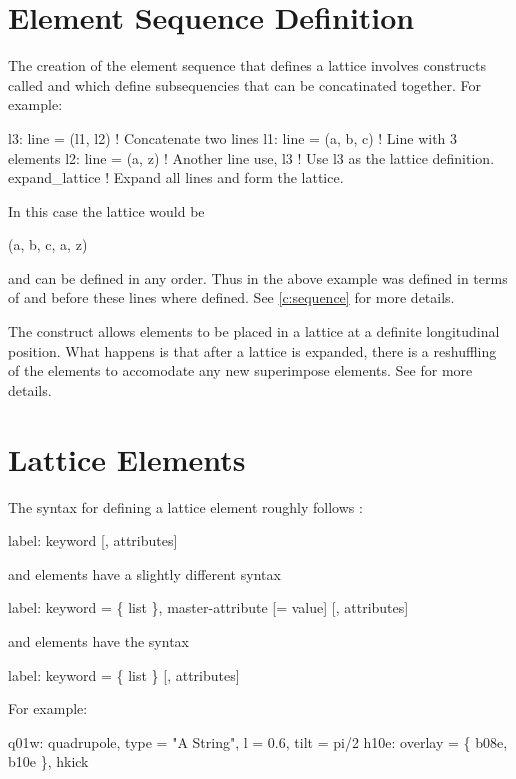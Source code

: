\section{Element Sequence Definition}

The creation of the element sequence that defines a lattice involves
constructs called  and  which define subsequencies
that can be concatinated together. For example:
\begin{example}
  l3: line = (l1, l2)   ! Concatenate two lines
  l1: line = (a, b, c)  ! Line with 3 elements
  l2: line = (a, z)     ! Another line 
  use, l3               ! Use l3 as the lattice definition.
  expand_lattice        ! Expand all lines and form the lattice.
\end{example}
In this case the lattice would be
\begin{example}
  (a, b, c, a, z)
\end{example}
 and  can be defined in any order. Thus in the
above example  was defined in terms of  and 
before these lines where defined. See \cref{c:sequence} for more details.

The  construct allows elements to be placed in a
lattice at a definite longitudinal position. What happens is that
after a lattice is expanded, there is a reshuffling of the elements to
accomodate any new superimpose elements. See  for more
details.

\section{Lattice Elements}

The syntax for defining a lattice element roughly follows \MAD:
\begin{example}
  label: keyword [, attributes]
\end{example}
 and  elements have a slightly different syntax
\begin{example}
  label: keyword = \{ list \}, master-attribute [= value] [, attributes]
\end{example}
and  elements have the syntax
\begin{example}
  label: keyword = \{ list \} [, attributes]
\end{example}  
For example:
\begin{example}
  q01w: quadrupole, type = "A String", l = 0.6, tilt = pi/2
  h10e: overlay = \{ b08e, b10e \}, hkick
\end{example}

